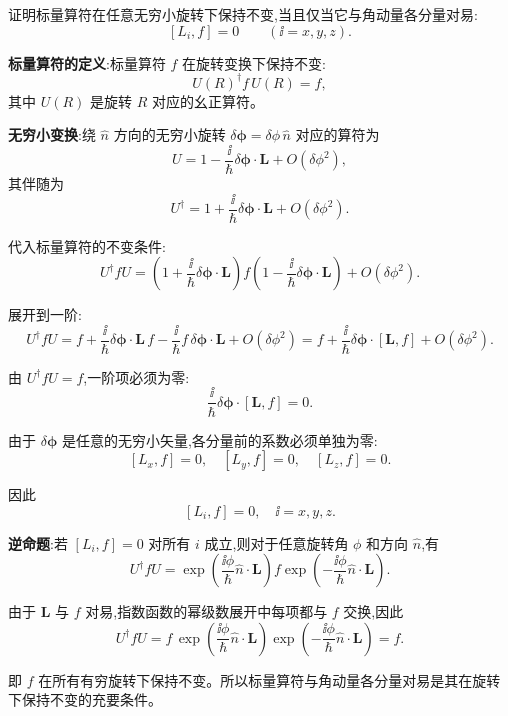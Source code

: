 \begin{question}
证明标量算符在任意无穷小旋转下保持不变,当且仅当它与角动量各分量对易:
\[
[L_i,f]=0\qquad (\ii=x,y,z).
\]
\end{question}
\begin{solution}
	\textbf{标量算符的定义}:标量算符 $f$ 在旋转变换下保持不变:
	\[
	U(R)^\dagger f\,U(R) = f,
	\]
	其中 $U(R)$ 是旋转 $R$ 对应的幺正算符。

	\textbf{无穷小变换}:绕 $\hat n$ 方向的无穷小旋转 $\delta\boldsymbol\phi = \delta\phi\,\hat n$ 对应的算符为
	\[
	U = 1 - \frac{\ii}{\hbar}\delta\boldsymbol\phi\cdot\mathbf L + O(\delta\phi^2),
	\]
	其伴随为
	\[
	U^\dagger = 1 + \frac{\ii}{\hbar}\delta\boldsymbol\phi\cdot\mathbf L + O(\delta\phi^2).
	\]

	代入标量算符的不变条件:
	\[
	U^\dagger f U = \left(1+\frac{\ii}{\hbar}\delta\boldsymbol\phi\cdot\mathbf L\right)
	f\left(1-\frac{\ii}{\hbar}\delta\boldsymbol\phi\cdot\mathbf L\right) + O(\delta\phi^2).
	\]

	展开到一阶:
	\[
	U^\dagger f U = f + \frac{\ii}{\hbar}\delta\boldsymbol\phi\cdot\mathbf L\,f
	- \frac{\ii}{\hbar}f\,\delta\boldsymbol\phi\cdot\mathbf L + O(\delta\phi^2)
	= f + \frac{\ii}{\hbar}\delta\boldsymbol\phi\cdot[\mathbf L,f] + O(\delta\phi^2).
	\]

	由 $U^\dagger f U = f$,一阶项必须为零:
	\[
	\frac{\ii}{\hbar}\delta\boldsymbol\phi\cdot[\mathbf L,f] = 0.
	\]

	由于 $\delta\boldsymbol\phi$ 是任意的无穷小矢量,各分量前的系数必须单独为零:
	\[
	[L_x,f]=0,\quad [L_y,f]=0,\quad [L_z,f]=0.
	\]

	因此
	\[
	\boxed{[L_i,f]=0,\quad \ii=x,y,z}.
	\]

	\textbf{逆命题}:若 $[L_i,f]=0$ 对所有 $i$ 成立,则对于任意旋转角 $\phi$ 和方向 $\hat n$,有
	\[
	U^\dagger f U = \exp\!\left(\frac{\ii\phi}{\hbar}\hat n\cdot\mathbf L\right) f
	\exp\!\left(-\frac{\ii\phi}{\hbar}\hat n\cdot\mathbf L\right).
	\]

	由于 $\mathbf L$ 与 $f$ 对易,指数函数的幂级数展开中每项都与 $f$ 交换,因此
	\[
	U^\dagger f U = f\,\exp\!\left(\frac{\ii\phi}{\hbar}\hat n\cdot\mathbf L\right)
	\exp\!\left(-\frac{\ii\phi}{\hbar}\hat n\cdot\mathbf L\right)=f.
	\]

	即 $f$ 在所有有穷旋转下保持不变。所以标量算符与角动量各分量对易是其在旋转下保持不变的充要条件。
	\end{solution}

